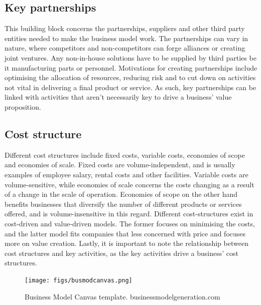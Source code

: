 \subsection{Key partnerships}
This building block concerns the partnerships, suppliers and other third party entities needed to make the business model work. The partnerships can vary in nature, where competitors and non-competitors can forge alliances or creating joint ventures. Any non-in-house solutions have to be supplied by third parties be it manufacturing parts or personnel. Motivations for creating partnerships include optimising the allocation of resources, reducing risk and to cut down on activities not vital in delivering a final product or service. As such, key partnerships can be linked with activities that aren't necessarily key to drive a business' value proposition. 

\subsection{Cost structure}
Different cost structures include fixed costs, variable costs, economies of scope and economies of scale. Fixed costs are volume-independent, and is usually examples of employee salary, rental costs and other facilities. Variable costs are volume-sensitive, while economies of scale concerns the costs changing as a result of a change in the scale of operation. Economies of scope on the other hand benefits businesses that diversify the number of different products or services offered, and is volume-insensitive in this regard. Different cost-structures exist in cost-driven and value-driven models. The former focuses on minimising the costs, and the latter model fits companies that less concerned with price and focuses more on value creation.
Lastly, it is important to note the relationship between cost structures and key activities, as the key activities drive a business' cost structures. 

\begin{figure}[]
\centering
\texttt{[image: figs/busmodcanvas.png]}
\caption{Business Model Canvas template. \textcopyright businessmodelgeneration.com}
\label{fig:businessmodelcanvas}
\end{figure}
